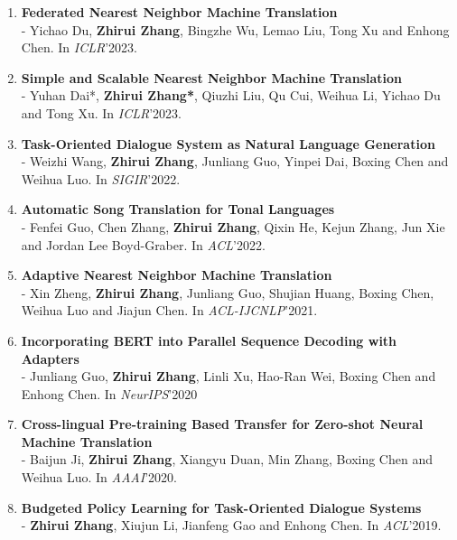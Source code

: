 \documentclass{resume}
\begin{document}
\begin{enumerate}
\item \normalsize \textbf{Federated Nearest Neighbor Machine Translation}\\
\small - Yichao Du, \textbf{Zhirui Zhang}, Bingzhe Wu, Lemao Liu, Tong Xu and Enhong Chen. In \textit{ICLR}'2023.

\item \normalsize \textbf{Simple and Scalable Nearest Neighbor Machine Translation}\\
\small - Yuhan Dai*, \textbf{Zhirui Zhang*}, Qiuzhi Liu, Qu Cui, Weihua Li, Yichao Du and Tong Xu. In \textit{ICLR}'2023.

\item \normalsize \textbf{Task-Oriented Dialogue System as Natural Language Generation}\\
\small - Weizhi Wang, \textbf{Zhirui Zhang}, Junliang Guo, Yinpei Dai, Boxing Chen and Weihua Luo. In \textit{SIGIR}'2022.

\item \normalsize \textbf{Automatic Song Translation for Tonal Languages}\\
\small - Fenfei Guo, Chen Zhang, \textbf{Zhirui Zhang}, Qixin He, Kejun Zhang, Jun Xie and Jordan Lee Boyd-Graber. In \textit{ACL}'2022.

\item \normalsize \textbf{Adaptive Nearest Neighbor Machine Translation}\\
\small - Xin Zheng, \textbf{Zhirui Zhang}, Junliang Guo, Shujian Huang, Boxing Chen, Weihua Luo and Jiajun Chen. In \textit{ACL-IJCNLP}'2021.

\item \normalsize \textbf{Incorporating BERT into Parallel Sequence Decoding with Adapters}\\
\small - Junliang Guo, \textbf{Zhirui Zhang}, Linli Xu, Hao-Ran Wei, Boxing Chen and Enhong Chen. In \textit{NeurIPS}'2020

\item \normalsize \textbf{Cross-lingual Pre-training Based Transfer for Zero-shot Neural Machine Translation} \\
\small - Baijun Ji, \textbf{Zhirui Zhang}, Xiangyu Duan, Min Zhang, Boxing Chen and Weihua Luo. In \textit{AAAI}'2020.

\item \normalsize \textbf{Budgeted Policy Learning for Task-Oriented Dialogue Systems} \\
\small - \textbf{Zhirui Zhang}, Xiujun Li, Jianfeng Gao and Enhong Chen. In \textit{ACL}'2019.


\end{enumerate}
\end{document}
